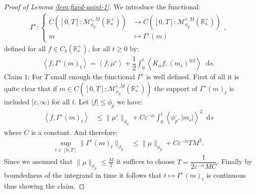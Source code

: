 \documentclass[11pt,a4paper]{article}
\newcommand{\RRP}{\mathbb{R}^+_*}
\newcommand{\MC}{\mathcal{M}}
\newcommand{\brac}[1]{\left\langle#1\right\rangle}
\newcommand{\dd}{\mathop{}\!\mathrm{d}}
\begin{document}
\begin{proof}[Proof of Lemma \ref{lem:fixed-point-1}]
    We introduce the functional:
    \begin{align*}
    \Gamma^\varepsilon : 
    \left\lbrace 
    \begin{aligned}
        C\left([0,T]:\MC^{\varepsilon,M}_{\phi_p}(\RRP) \right) &\to C\left([0,T]:\MC^{\varepsilon,M}_{\phi_p}(\RRP) \right)\\
         m & \mapsto \Gamma^\varepsilon(m)
    \end{aligned}
    \right.,
    \end{align*}
    defined for all $f \in C_b(\RRP)$, for all $t \geq 0$ by:
    \begin{align*}
        \brac{f,\Gamma^\varepsilon(m)_t}= \brac{f,\mu^\varepsilon} + \dfrac12\int_0^t \brac{K_\alpha f,\left(m_s\right)^{\otimes 2}} \dd s.
    \end{align*}
    Claim $1$: For $T$ small enough the functional $\Gamma^\varepsilon$ is well defined. First of all it is quite clear that if $m \in C\left([0,T]:\MC^{\varepsilon,M}_{\phi_p}(\RRP) \right)$ the support of $\Gamma^\varepsilon(m)_t$ is included $[\varepsilon,\infty)$ for all $t$. Let $|f| \leq \phi_p$ we have:
    \begin{align*}
        \brac{f,\Gamma^\varepsilon(m)_t} &\leq \|\mu^\varepsilon\|_{\phi_p} + C\varepsilon^{-\alpha}\int_0^t \brac{\phi_p,|m_s|}^2 \dd s 
    \end{align*}
    where $C$ is a constant. And therefore:
    \begin{align*}
        \sup\limits_{t\in [0,T]} \| \Gamma^\varepsilon(m)_t\|_{\phi_p} 
        &\leq \|\mu\|_{\phi_p} + C\varepsilon^{-\alpha} T M^2.
    \end{align*}
    Since we assumed that $\|\mu\|_{\phi_p} \leq \frac{M}{2}$ it suffices to choose $T = \dfrac{1}{2\varepsilon^{-\alpha}MC}$. Finally by boundedness of the integrand in time it follows that $t \mapsto \Gamma^\varepsilon(m)_t$ is continuous thus showing the claim.


\end{proof}
\end{document}
